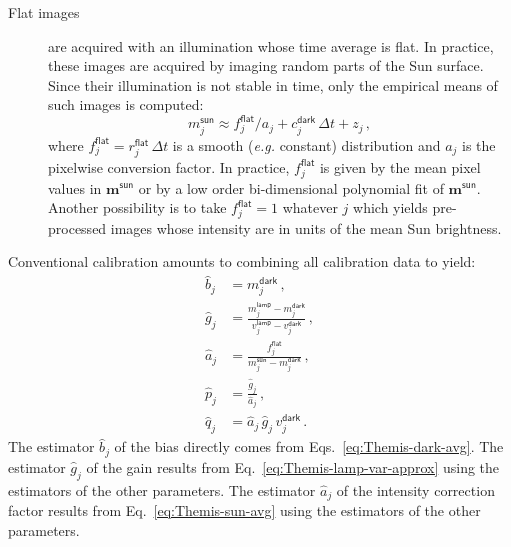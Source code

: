 \documentclass[a4paper,11pt,twoside]{scrartcl}
\newcommand*{\eg}{\emph{e.g.}\xspace}
\newcommand*{\Tag}[1]{\mathsf{#1}}
\newcommand*{\estim}[1]{\widehat{#1}}
\newcommand*{\V}[1]{\boldsymbol{#1}}   %
\theoremstyle{plain} %
\theoremstyle{definition}
\theoremstyle{remark}
\begin{document}
\begin{description}
\item[Flat images] are acquired with an illumination whose time average is
flat.  In practice, these images are acquired by imaging random parts of the
Sun surface.  Since their illumination is not stable in time, only the
empirical means of such images is computed:
\begin{equation}
  m^\Tag{sun}_j \approx f^\Tag{flat}_j/a_j + c^\Tag{dark}_j\,\Delta t + z_j \,,
  \label{eq:Themis-sun-avg}
\end{equation}
where $f^\Tag{flat}_j = r^\Tag{flat}_j\,\Delta t$ is a smooth (\eg
constant) distribution and $a_j$ is the pixelwise conversion factor. In
practice, $f^\Tag{flat}_j$ is given by the mean pixel values in $\V
m^\Tag{sun}$ or by a low order bi-dimensional polynomial fit of $\V
m^\Tag{sun}$.  Another possibility is to take $f^\Tag{flat}_j = 1$ whatever
$j$ which yields pre-processed images whose intensity are in units of the mean
Sun brightness.

\end{description}

Conventional calibration amounts to combining all calibration data to yield:
\begin{align}
  \estim{b}_j &= m^\Tag{dark}_j \,, \\
  \estim{g}_j &= \frac{m^\Tag{lamp}_j - m^\Tag{dark}_j}
                      {v^\Tag{lamp}_j - v^\Tag{dark}_j} \,, \\
  \estim{a}_j &= \frac{f^\Tag{flat}_j}
                      {m^\Tag{sun}_j - m^\Tag{dark}_j} \,, \\
  \estim{p}_j &= \frac{\estim{g}_j}{\estim{a}_j} \,,\\
  \estim{q}_j &= \estim{a}_j\,\estim{g}_j\,v^\Tag{dark}_j \,.
\end{align}
The estimator $\estim{b}_j$ of the bias directly comes from
Eqs.~\eqref{eq:Themis-dark-avg}. The estimator $\estim{g}_j$ of the gain
results from Eq.~\eqref{eq:Themis-lamp-var-approx} using the estimators of the
other parameters.  The estimator $\estim{a}_j$ of the intensity correction
factor results from Eq.~\eqref{eq:Themis-sun-avg} using the estimators of the
other parameters.
\end{document}
